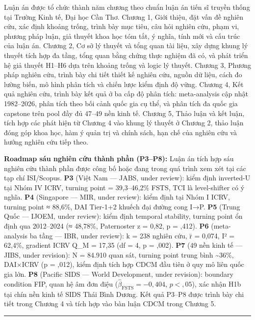 \documentclass[12pt,a4paper]{article}
\begin{document}
Luận án được tổ chức thành năm chương theo chuẩn luận án tiến sĩ truyền
thống tại Trường Kinh tế, Đại học Cần Thơ. Chương 1, Giới thiệu, đặt vấn
đề nghiên cứu, xác định khoảng trống, trình bày mục tiêu, câu hỏi nghiên
cứu, phạm vi, phương pháp luận, giả thuyết khoa học tóm tắt, ý nghĩa,
tính mới và cấu trúc của luận án. Chương 2, Cơ sở lý thuyết và tổng quan
tài liệu, xây dựng khung lý thuyết tích hợp đa tầng, tổng quan bằng
chứng thực nghiệm đã có, và phát triển hệ giả thuyết H1--H6 dựa trên
khoảng trống và logic lý thuyết. Chương 3, Phương pháp nghiên cứu, trình
bày chi tiết thiết kế nghiên cứu, nguồn dữ liệu, cách đo lường biến, mô
hình phân tích và chiến lược kiểm định độ vững. Chương 4, Kết quả nghiên
cứu, trình bày kết quả ở ba cấp độ phân tích: meta-analysis cập nhật
1982--2026, phân tích theo bối cảnh quốc gia cụ thể, và phân tích đa
quốc gia capstone trên pool đầy đủ 47--49 nền kinh tế. Chương 5, Thảo
luận và kết luận, tích hợp các phát hiện từ Chương 4 vào khung lý thuyết
ở Chương 2, thảo luận đóng góp khoa học, hàm ý quản trị và chính sách,
hạn chế của nghiên cứu và hướng nghiên cứu tiếp theo.

\textbf{Roadmap sáu nghiên cứu thành phần (P3--P8):} Luận án tích hợp
sáu nghiên cứu thành phần được công bố hoặc đang trong quá trình xem xét
tại các tạp chí ISI/Scopus. \textbf{P3} (Việt Nam --- JABS, under
review): kiểm định inverted-U tại Nhóm IV ICRV, turning point =
39,3--46,2\% FSTS, TCI là level-shifter có ý nghĩa. \textbf{P4}
(Singapore --- MIR, under review): kiểm định tại Nhóm I ICRV, turning
point ≈ 88,6\%, DAI Tier-1+2 khuếch đại đường cong I→P. \textbf{P5}
(Trung Quốc --- IJOEM, under review): kiểm định temporal stability,
turning point ổn định qua 2012--2024 (≈ 48,78\%, Paternoster z = 0,82, p
= ,412). \textbf{P6} (meta-analysis ba tầng --- IBR, under review): k =
238 nghiên cứu, r̄ = 0,074, I² = 62,4\%, gradient ICRV Q\_M = 17,35 (df =
4, p = ,002). \textbf{P7} (49 nền kinh tế --- JIBS, under revision): N =
84.910 quan sát, turning point trung bình \textasciitilde36\%, DAI×ICRV
(p = ,012), kiểm định tích hợp CDCM đầu tiên ở quy mô liên quốc gia lớn.
\textbf{P8} (Pacific SIDS --- World Development, under revision):
boundary condition FIP, quan hệ âm đơn điệu
(\(\hat{\beta}_\text{FSTS} = -0{,}404\), \(p < {,}05\)), xác nhận H1b
tại chín nền kinh tế SIDS Thái Bình Dương. Kết quả P3--P8 được trình bày
chi tiết trong Chương 4 và tích hợp vào bàn luận CDCM trong Chương 5.

\begin{center}\rule{0.5\linewidth}{0.5pt}\end{center}
\end{document}
